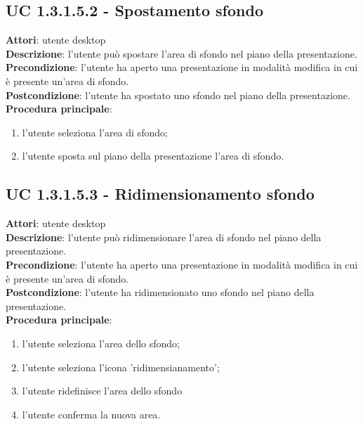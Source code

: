 \subsection{UC 1.3.1.5.2 - Spostamento sfondo}{
	\label{uc1.3.1.5.2}
	\textbf{Attori}: utente desktop \\
	\textbf{Descrizione}: l'utente può spostare l'area di sfondo nel piano della presentazione. \\
	\textbf{Precondizione}: l'utente ha aperto una presentazione in modalità modifica in cui è presente un'area di sfondo.	\\
	\textbf{Postcondizione}: l'utente ha spostato uno sfondo nel piano della presentazione.	\\
	\textbf{Procedura principale}:
	\begin{enumerate}
		\item l'utente seleziona l'area di sfondo;
		\item l'utente sposta sul piano della presentazione l'area di sfondo.
	\end{enumerate}
}
\subsection{UC 1.3.1.5.3 - Ridimensionamento sfondo}{
	\label{uc1.3.1.5.3}
	\textbf{Attori}: utente desktop \\
	\textbf{Descrizione}: l'utente può ridimensionare l'area di sfondo nel piano della presentazione. \\
	\textbf{Precondizione}: l'utente ha aperto una presentazione in modalità modifica in cui è presente un'area di sfondo.	\\
	\textbf{Postcondizione}: l'utente ha ridimensionato uno sfondo nel piano della presentazione.	\\
	\textbf{Procedura principale}:
	\begin{enumerate}
		\item l'utente seleziona l'area dello sfondo;
		\item l'utente seleziona l'icona 'ridimensianamento';
		\item l'utente ridefinisce l'area dello sfondo
		\item l'utente conferma la nuova area.
	\end{enumerate}
}
